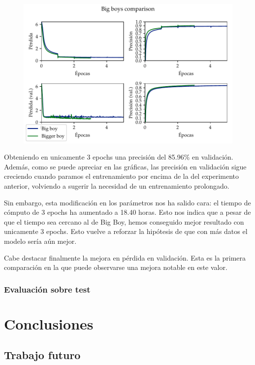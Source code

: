 \documentclass[a4paper, 20pt, dvipsnames]{article}
\begin{document}
\begin{figure}[H]
	\centering
	\includegraphics{fig/bigboys.pdf}
\end{figure}

Obteniendo en unicamente 3 epochs una precisión del 85.96\% en validación. Además, como se puede apreciar en las gráficas, las precisión en validación sigue creciendo cuando paramos el entrenamiento por encima de la del experimento anterior, volviendo a sugerir la necesidad de un entrenamiento prolongado.

Sin embargo, esta modificación en los parámetros nos ha salido cara: el tiempo de cómputo de 3 epochs ha aumentado a 18.40 horas. Esto nos indica que a pesar de que el tiempo sea cercano al de Big Boy, hemos conseguido mejor resultado con unicamente 3 epochs. Esto vuelve a reforzar la hipótesis de que con más datos el modelo sería aún mejor.

Cabe destacar finalmente la mejora en pérdida en validación. Esta es la primera comparación en la que puede observarse una mejora notable en este valor.


\subsubsection{Evaluación sobre test}

\section{Conclusiones}


\subsection{Trabajo futuro}
\end{document}
